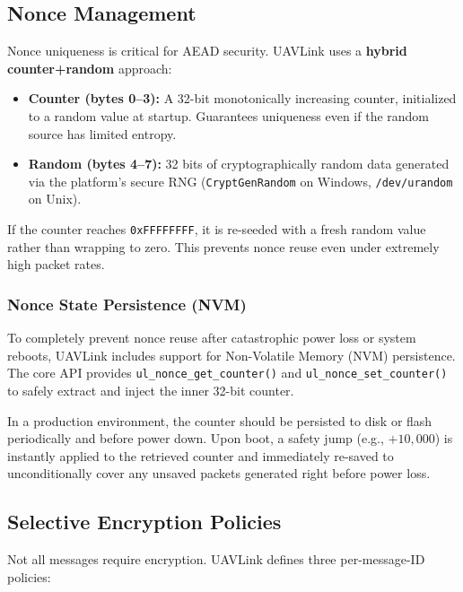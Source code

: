 \documentclass[11pt,a4paper]{article}
\begin{document}
\subsection{Nonce Management}

Nonce uniqueness is critical for AEAD security. UAVLink uses a \textbf{hybrid counter+random} approach:

\begin{itemize}[noitemsep]
    \item \textbf{Counter (bytes 0--3):} A 32-bit monotonically increasing counter, initialized to a random value at startup. Guarantees uniqueness even if the random source has limited entropy.
    \item \textbf{Random (bytes 4--7):} 32 bits of cryptographically random data generated via the platform's secure RNG (\texttt{CryptGenRandom} on Windows, \texttt{/dev/urandom} on Unix).
\end{itemize}

\begin{warnbox}
If the counter reaches \texttt{0xFFFFFFFF}, it is re-seeded with a fresh random value rather than wrapping to zero. This prevents nonce reuse even under extremely high packet rates.
\end{warnbox}

\subsubsection*{Nonce State Persistence (NVM)}

To completely prevent nonce reuse after catastrophic power loss or system reboots, UAVLink includes support for Non-Volatile Memory (NVM) persistence. The core API provides \texttt{ul\_nonce\_get\_counter()} and \texttt{ul\_nonce\_set\_counter()} to safely extract and inject the inner 32-bit counter. 

In a production environment, the counter should be persisted to disk or flash periodically and before power down. Upon boot, a safety jump (e.g., $+10,000$) is instantly applied to the retrieved counter and immediately re-saved to unconditionally cover any unsaved packets generated right before power loss.

\subsection{Selective Encryption Policies}

Not all messages require encryption. UAVLink defines three per-message-ID policies:
\end{document}
